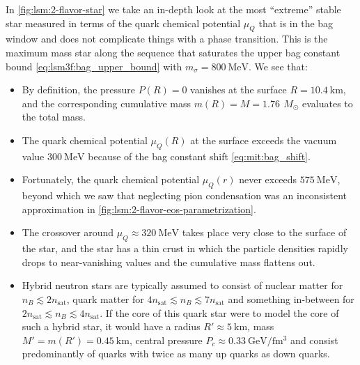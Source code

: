 In \cref{fig:lsm:2-flavor-star} we take an in-depth look at the most ``extreme'' stable star measured in terms of the quark chemical potential $\mu_Q$
that is in the bag window and does not complicate things with a phase transition.
This is the maximum mass star along the sequence that saturates the upper bag constant bound \eqref{eq:lsm3f:bag_upper_bound} with $m_\sigma=\SI{800}{\mega\electronvolt}$.
We see that:
\begin{itemize}
\item By definition, the pressure $P(R)=0$ vanishes at the surface $R=\SI{10.4}{\kilo\meter}$,
      and the corresponding cumulative mass $m(R)=M=\SI{1.76}{}\,M_\odot$ evaluates to the total mass.
\item The quark chemical potential $\mu_Q(R)$ at the surface exceeds the vacuum value $\SI{300}{\mega\electronvolt}$ because of the bag constant shift \eqref{eq:mit:bag_shift}.
\item Fortunately, the quark chemical potential $\mu_Q(r)$ never exceeds $\SI{575}{\mega\electronvolt}$, beyond which we saw that neglecting pion condensation was an inconsistent approximation in \cref{fig:lsm:2-flavor-eos-parametrization}.
\item The crossover around $\mu_Q \approx \SI{320}{\mega\electronvolt}$ takes place very close to the surface of the star,
      and the star has a thin crust in which the particle densities rapidly drops to near-vanishing values and the cumulative mass flattens out.
\item Hybrid neutron stars are typically assumed to consist of nuclear matter for $n_B \lesssim 2 n_\text{sat}$,
      quark matter for $4 n_\text{sat} \lesssim n_B \lesssim 7 n_\text{sat}$ and something in-between for $2 n_\text{sat} \lesssim n_B \lesssim 4 n_\text{sat}$.
      If the core of this quark star were to model the core of such a hybrid star,
      it would have a radius $R' \approx \SI{5}{\kilo\meter}$, mass $M'=m(R')=\SI{0.45}{\kilo\meter}$, central pressure $P_c \approx \SI{0.33}{\giga\electronvolt\per\femto\meter\cubed}$
      and consist predominantly of quarks with twice as many up quarks as down quarks.
\end{itemize}

